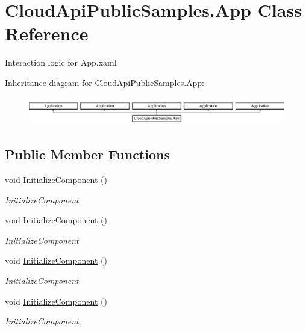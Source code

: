 \hypertarget{class_cloud_api_public_samples_1_1_app}{\section{Cloud\-Api\-Public\-Samples.\-App Class Reference}
\label{class_cloud_api_public_samples_1_1_app}
}


Interaction logic for App.\-xaml  


Inheritance diagram for Cloud\-Api\-Public\-Samples.\-App\-:\begin{figure}[H]
\begin{center}
\leavevmode
\includegraphics[height=1.237569cm]{class_cloud_api_public_samples_1_1_app}
\end{center}
\end{figure}
\subsection*{Public Member Functions}
\begin{DoxyCompactItemize}
\item 
void \hyperlink{class_cloud_api_public_samples_1_1_app_adbea543c1a41014a22b9323df5115871}{Initialize\-Component} ()
\begin{DoxyCompactList}\small\item\em Initialize\-Component \end{DoxyCompactList}\item 
void \hyperlink{class_cloud_api_public_samples_1_1_app_adbea543c1a41014a22b9323df5115871}{Initialize\-Component} ()
\begin{DoxyCompactList}\small\item\em Initialize\-Component \end{DoxyCompactList}\item 
void \hyperlink{class_cloud_api_public_samples_1_1_app_adbea543c1a41014a22b9323df5115871}{Initialize\-Component} ()
\begin{DoxyCompactList}\small\item\em Initialize\-Component \end{DoxyCompactList}\item 
void \hyperlink{class_cloud_api_public_samples_1_1_app_adbea543c1a41014a22b9323df5115871}{Initialize\-Component} ()
\begin{DoxyCompactList}\small\item\em Initialize\-Component \end{DoxyCompactList}\end{DoxyCompactItemize}
